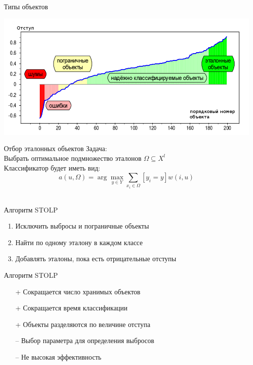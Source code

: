 \documentclass[10pt]{beamer}
\begin{document}
{
\begin{frame}{Типы объектов}
  \begin{center}
    \includegraphics[width=\textwidth, keepaspectratio]{images/margin}
  \end{center}
\end{frame}
}

\begin{frame}{Отбор эталонных объектов}
	\alert{Задача}:\\
	Выбрать оптимальное подмножество эталонов $\Omega\subseteq X^l$\\ 
    \bigbreak
	Классификатор будет иметь вид:\\
	$${a(u, \Omega) = \arg\max\limits_{y \in Y} \sum\limits_{x_i \in \Omega} [y_i = y]w(i, u) }$$\\
\end{frame}

\begin{frame}{Алгоритм STOLP}
	\begin{enumerate}
		\item Исключить выбросы и пограничные объекты
		\item Найти по одному эталону в каждом классе
		\item Добавлять эталоны, пока есть отрицательные отступы	
	\end{enumerate}
\end{frame}

\begin{frame}{Алгоритм STOLP}
	\begin{itemize} [<+- | alert@+>]
	\item[+] Сокращается число хранимых объектов
	\item[+] Сокращается время классификации
	\item[+] Объекты разделяются по величине отступа
	\bigbreak
	\item[--] Выбор параметра для определения выбросов
	\item[--] Не высокая эффективность
	\end{itemize}
\end{frame}
\end{document}
